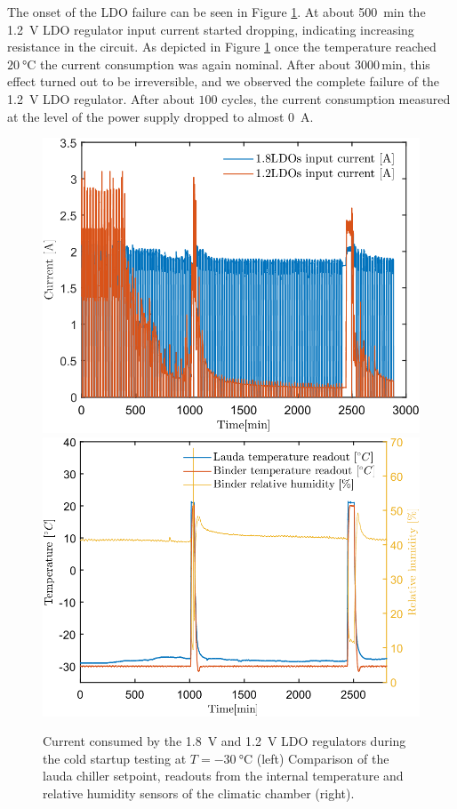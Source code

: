 \begin{table}[!h]
\centering
\caption{Detailed description of the \gls{LDO} failure with regard to the type and number of cycles.}
\label{tab:SetA}
\end{table}
The onset of the \gls{LDO} failure can be seen in Figure \ref{fig_cold_startup}. At about \SI{500}{\minute} the \SI{1.2}{\volt} LDO regulator input current started dropping, indicating increasing resistance in the circuit. As depicted in Figure \ref{fig_cold_startup} once the temperature reached $\SI{20}{\celsius}$ the current consumption was again nominal. After about  $3000\,\mathrm{min}$, this effect turned out to be irreversible, and we observed the complete failure of the \SI{1.2}{\volt} \gls{LDO} regulator. After about $100$ cycles, the current consumption measured at the level of the power supply dropped to almost \SI{0}{\ampere}.
\begin{figure}[!h]
\centering
\includegraphics[width=0.46\columnwidth]{Chapter4/images/currents_long.png}
\includegraphics[width=0.48\columnwidth]{Chapter4/images/cycling.png}
\caption{Current consumed by the \SI{1.8}{\volt} and \SI{1.2}{\volt} \gls{LDO} regulators during the cold startup testing at $T = \SI{-30}{\celsius}$ (left)
Comparison of the lauda chiller setpoint, readouts from the internal temperature and relative humidity sensors of the climatic chamber (right).}
\label{fig_cold_startup}
\end{figure}

